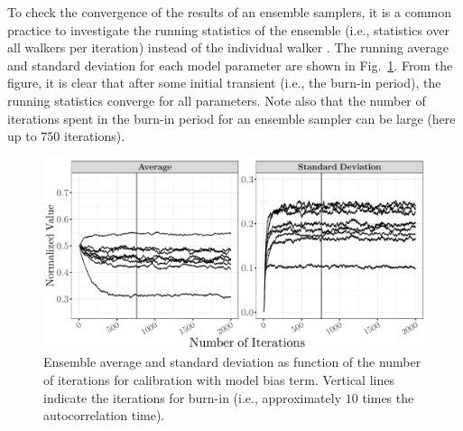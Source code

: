 To check the convergence of the results of an ensemble samplers, it is a common practice to investigate the running statistics of the ensemble (i.e., statistics over all walkers per iteration) instead of the individual walker \cite{Foreman-Mackey2013,Akeret2013}.
The running average and standard deviation for each model parameter are shown in Fig.~\ref{fig:ch5_plot_ens_stat_mcmc}.
From the figure, it is clear that after some initial transient (i.e., the burn-in period), the running statistics converge for all parameters.
Note also that the number of iterations spent in the burn-in period for an ensemble sampler can be large (here up to $750$ iterations).
\begin{figure}[!bth]
    \centering
    \includegraphics[width=1.0\textwidth]{../figures/chapter5/figures/plotEnsStatMCMC}
    \caption[Ensemble average and standard deviation as function of the number of iterations for calibration with model bias term.]{Ensemble average and standard deviation as function of the number of iterations for calibration with model bias term. Vertical lines indicate the iterations for burn-in (i.e., approximately $10$ times the autocorrelation time).}
    \label{fig:ch5_plot_ens_stat_mcmc}
\end{figure}

